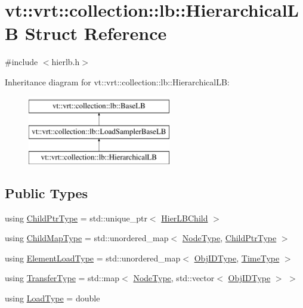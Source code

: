 \hypertarget{structvt_1_1vrt_1_1collection_1_1lb_1_1_hierarchical_l_b}{}\section{vt\+:\+:vrt\+:\+:collection\+:\+:lb\+:\+:Hierarchical\+LB Struct Reference}
\label{structvt_1_1vrt_1_1collection_1_1lb_1_1_hierarchical_l_b}


{\ttfamily \#include $<$hierlb.\+h$>$}

Inheritance diagram for vt\+:\+:vrt\+:\+:collection\+:\+:lb\+:\+:Hierarchical\+LB\+:\begin{figure}[H]
\begin{center}
\leavevmode
\includegraphics[height=3.000000cm]{structvt_1_1vrt_1_1collection_1_1lb_1_1_hierarchical_l_b}
\end{center}
\end{figure}
\subsection*{Public Types}
\begin{DoxyCompactItemize}
\item 
using \hyperlink{structvt_1_1vrt_1_1collection_1_1lb_1_1_hierarchical_l_b_a4dd8525145427a29350a287a777655de}{Child\+Ptr\+Type} = std\+::unique\+\_\+ptr$<$ \hyperlink{structvt_1_1vrt_1_1collection_1_1lb_1_1_hier_l_b_child}{Hier\+L\+B\+Child} $>$
\item 
using \hyperlink{structvt_1_1vrt_1_1collection_1_1lb_1_1_hierarchical_l_b_a95e5a93033703216cad8ec7a3da7a2ef}{Child\+Map\+Type} = std\+::unordered\+\_\+map$<$ \hyperlink{namespacevt_a866da9d0efc19c0a1ce79e9e492f47e2}{Node\+Type}, \hyperlink{structvt_1_1vrt_1_1collection_1_1lb_1_1_hierarchical_l_b_a4dd8525145427a29350a287a777655de}{Child\+Ptr\+Type} $>$
\item 
using \hyperlink{structvt_1_1vrt_1_1collection_1_1lb_1_1_hierarchical_l_b_ae63d1ddb968e51d0c57b546bdc1d08c7}{Element\+Load\+Type} = std\+::unordered\+\_\+map$<$ \hyperlink{structvt_1_1vrt_1_1collection_1_1lb_1_1_base_l_b_a790b22acf448880599724749cdc4e9b3}{Obj\+I\+D\+Type}, \hyperlink{namespacevt_a876a9d0cd5a952859c72de8a46881442}{Time\+Type} $>$
\item 
using \hyperlink{structvt_1_1vrt_1_1collection_1_1lb_1_1_hierarchical_l_b_a83550b541c35c8a1cc0c97779d1c8184}{Transfer\+Type} = std\+::map$<$ \hyperlink{namespacevt_a866da9d0efc19c0a1ce79e9e492f47e2}{Node\+Type}, std\+::vector$<$ \hyperlink{structvt_1_1vrt_1_1collection_1_1lb_1_1_base_l_b_a790b22acf448880599724749cdc4e9b3}{Obj\+I\+D\+Type} $>$ $>$
\item 
using \hyperlink{structvt_1_1vrt_1_1collection_1_1lb_1_1_hierarchical_l_b_aac9e2507c1e3c0a3321567ff02aebe6f}{Load\+Type} = double
\end{DoxyCompactItemize}
